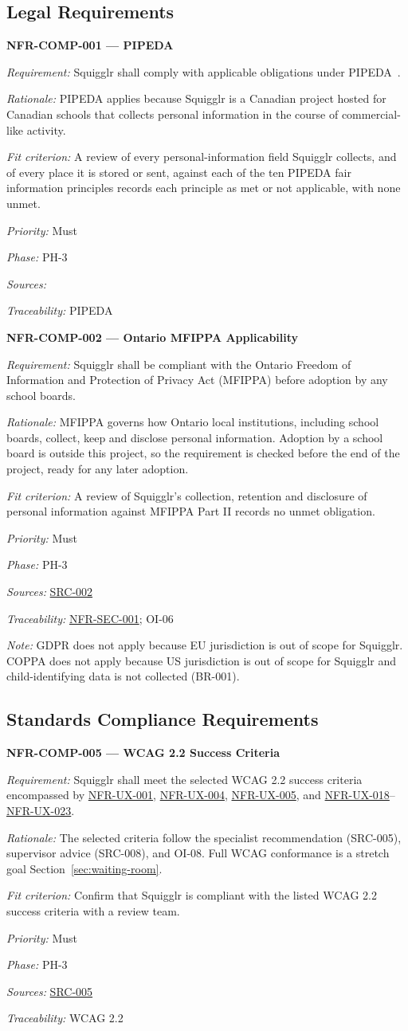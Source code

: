 \documentclass[12pt]{article}
\renewcommand{\_}{\textunderscore\allowbreak}%
\newenvironment{srsrequirement}[2]{%
  \par\medskip\noindent\phantomsection\label{req:#1}%
  \textbf{#1 --- #2}\par\nobreak\smallskip }{\par\medskip}
\newcommand{\reqfield}[2]{\noindent\textit{#1:} #2\par}
\newcommand{\reqshall}[1]{\reqfield{Requirement}{#1}}
\newcommand{\reqrationale}[1]{\reqfield{Rationale}{#1}}
\newcommand{\reqfit}[1]{\reqfield{Fit criterion}{#1}}
\newcommand{\reqpriority}[1]{\reqfield{Priority}{#1}}
\newcommand{\reqphase}[1]{\reqfield{Phase}{#1}}
\newcommand{\reqsources}[1]{\reqfield{Sources}{#1}}
\newcommand{\reqtraces}[1]{\reqfield{Traceability}{#1}}
\newcommand{\reqref}[1]{\hyperref[req:#1]{#1}}
\newcommand{\srcref}[1]{\hyperref[src:#1]{SRC-#1}}
\begin{document}
\subsection{Legal Requirements}
\begin{sloppypar}
\begin{srsrequirement}{NFR-COMP-001}{PIPEDA}
  \reqshall{Squigglr shall comply with applicable obligations under
PIPEDA~\cite{pipeda}.} \reqrationale{PIPEDA applies because Squigglr is a
Canadian project hosted for Canadian schools that collects personal information
in the course of commercial-like activity.} \reqfit{A review of every
personal-information field Squigglr collects, and of every place it is stored or
sent, against each of the ten PIPEDA fair information principles records each
principle as met or not applicable, with none unmet.}
  \reqpriority{Must}
  \reqphase{PH-3}
  \reqsources{\cite{pipeda}} \reqtraces{PIPEDA~\cite{pipeda}}
\end{srsrequirement}
\end{sloppypar}

\begin{srsrequirement}{NFR-COMP-002}{Ontario MFIPPA Applicability}
  \reqshall{Squigglr shall be compliant with the Ontario Freedom of Information
and Protection of Privacy Act (MFIPPA) before adoption by any school
boards.}
  \reqrationale{MFIPPA governs how Ontario local institutions, including school
  boards, collect, keep and disclose personal information. Adoption by a school
  board is outside this project, so the requirement is checked before the end of
  the project, ready for any later adoption.}
  \reqfit{A review of Squigglr's collection, retention and disclosure of
  personal information against MFIPPA Part II records no unmet obligation.}
  \reqpriority{Must}
  \reqphase{PH-3}
  \reqsources{\srcref{002}} \reqtraces{\reqref{NFR-SEC-001}; OI-06}
\end{srsrequirement}

\emph{Note:} GDPR does not apply because EU jurisdiction is out of scope for
Squigglr. COPPA does not apply because US jurisdiction is out of scope for
Squigglr and child-identifying data is not collected (BR-001).

\subsection{Standards Compliance Requirements}

\begin{srsrequirement}{NFR-COMP-005}{WCAG 2.2 Success Criteria}
  \reqshall{Squigglr shall meet the selected WCAG 2.2 success
criteria~\cite{wcag22} encompassed by \reqref{NFR-UX-001}, \reqref{NFR-UX-004},
\reqref{NFR-UX-005}, and \reqref{NFR-UX-018}--\reqref{NFR-UX-023}.}
\reqrationale{The selected criteria follow the specialist recommendation
(SRC-005), supervisor advice (SRC-008), and OI-08. Full WCAG conformance is a
stretch goal Section~\ref{sec:waiting-room}.}
  \reqfit{Confirm that Squigglr is compliant with the listed WCAG 2.2 success 
  criteria with a review team.}
  \reqpriority{Must}
  \reqphase{PH-3}
  \reqsources{\srcref{005}} \reqtraces{WCAG 2.2~\cite{wcag22}}
\end{srsrequirement}
\end{document}
